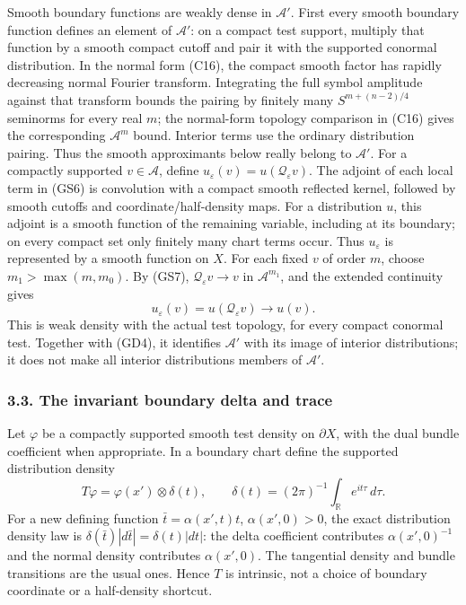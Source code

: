 \documentclass[
  11pt,
]{article}
\begin{document}
Smooth boundary functions are weakly dense in \(\mathcal A'\). First
every smooth boundary function defines an element of \(\mathcal A'\): on
a compact test support, multiply that function by a smooth compact
cutoff and pair it with the supported conormal distribution. In the
normal form (C16), the compact smooth factor has rapidly decreasing
normal Fourier transform. Integrating the full symbol amplitude against
that transform bounds the pairing by finitely many \(S^{m+(n-2)/4}\)
seminorms for every real \(m\); the normal-form topology comparison in
(C16) gives the corresponding \(\mathcal A^m\) bound. Interior terms use
the ordinary distribution pairing. Thus the smooth approximants below
really belong to \(\mathcal A'\). For a compactly supported
\(v\in\mathcal A\), define
\(u_\varepsilon(v)=u(\mathcal Q_\varepsilon v)\). The adjoint of each
local term in (GS6) is convolution with a compact smooth reflected
kernel, followed by smooth cutoffs and coordinate/half-density maps. For
a distribution \(u\), this adjoint is a smooth function of the remaining
variable, including at its boundary; on every compact set only finitely
many chart terms occur. Thus \(u_\varepsilon\) is represented by a
smooth function on \(X\). For each fixed \(v\) of order \(m\), choose
\(m_1>\max(m,m_0)\). By (GS7), \(\mathcal Q_\varepsilon v\to v\) in
\(\mathcal A^{m_1}\), and the extended continuity gives \[
 u_\varepsilon(v)=u(\mathcal Q_\varepsilon v)
       \longrightarrow u(v).
 \tag{GD5}
\] This is weak density with the actual test topology, for every compact
conormal test. Together with (GD4), it identifies \(\mathcal A'\) with
its image of interior distributions; it does not make all interior
distributions members of \(\mathcal A'\).

\subsubsection{3.3. The invariant boundary delta and
trace}\label{the-invariant-boundary-delta-and-trace}

Let \(\varphi\) be a compactly supported smooth test density on
\(\partial X\), with the dual bundle coefficient when appropriate. In a
boundary chart define the supported distribution density \[
 T\varphi=\varphi(x')\otimes\delta(t),\qquad
 \delta(t)=(2\pi)^{-1}\int_{\mathbb R}e^{it\tau}\,d\tau.
 \tag{GD6}
\] For a new defining function \(\bar t=\alpha(x',t)t\),
\(\alpha(x',0)>0\), the exact distribution density law is
\(\delta(\bar t)|d\bar t|=\delta(t)|dt|\): the delta coefficient
contributes \(\alpha(x',0)^{-1}\) and the normal density contributes
\(\alpha(x',0)\). The tangential density and bundle transitions are the
usual ones. Hence \(T\) is intrinsic, not a choice of boundary
coordinate or a half-density shortcut.
\end{document}
